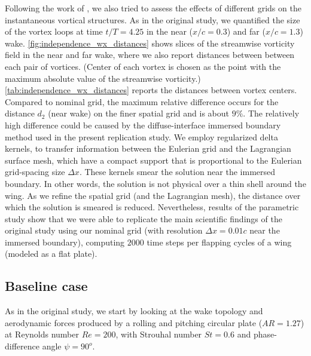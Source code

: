 Following the work of \citet{li_dong_2016}, we also tried to assess the effects of different grids on the instantaneous vortical structures.
As in the original study, we quantified the size of the vortex loops at time $t/T = 4.25$ in the near ($x/c = 0.3$) and far ($x/c = 1.3$) wake.
\cref{fig:independence_wx_distances} shows slices of the streamwise vorticity field in the near and far wake, where we also report distances between between each pair of vortices.
(Center of each vortex is chosen as the point with the maximum absolute value of the streamwise vorticity.)
\cref{tab:independence_wx_distances} reports the distances between vortex centers.
Compared to nominal grid, the maximum relative difference occurs for the distance $d_2$ (near wake) on the finer spatial grid and is about $9\%$.
The relatively high difference could be caused by the diffuse-interface immersed boundary method used in the present replication study.
We employ regularized delta kernels, to transfer information between the Eulerian grid and the Lagrangian surface mesh, which have a compact support that is proportional to the Eulerian grid-spacing size $\Delta x$.
These kernels smear the solution near the immersed boundary.
In other words, the solution is not physical over a thin shell around the wing.
As we refine the spatial grid (and the Lagrangian mesh), the distance over which the solution is smeared is reduced.
Nevertheless, results of the parametric study show that we were able to replicate the main scientific findings of the original study using our nominal grid (with resolution $\Delta x = 0.01c$ near the immersed boundary), computing $2000$ time steps per flapping cycles of a wing (modeled as a flat plate).

\subsection{Baseline case}

As in the original study, we start by looking at the wake topology and aerodynamic forces produced by a rolling and pitching circular plate ($AR = 1.27$) at Reynolds number $Re = 200$, with Strouhal number $St = 0.6$ and phase-difference angle $\psi = 90^o$.

